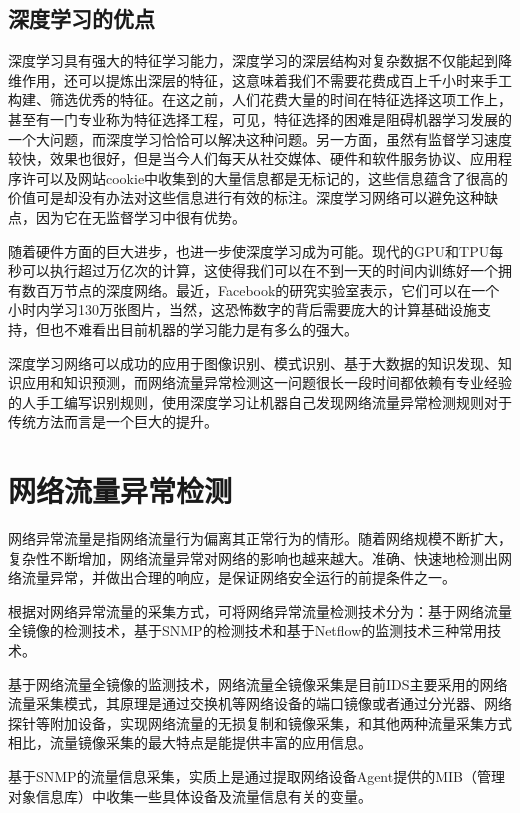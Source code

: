 \subsection{深度学习的优点}

深度学习具有强大的特征学习能力，深度学习的深层结构对复杂数据不仅能起到降维作用，还可以提炼出深层的特征，这意味着我们不需要花费成百上千小时来手工构建、筛选优秀的特征。在这之前，人们花费大量的时间在特征选择这项工作上，甚至有一门专业称为特征选择工程，可见，特征选择的困难是阻碍机器学习发展的一个大问题，而深度学习恰恰可以解决这种问题。另一方面，虽然有监督学习速度较快，效果也很好，但是当今人们每天从社交媒体、硬件和软件服务协议、应用程序许可以及网站cookie中收集到的大量信息都是无标记的，这些信息蕴含了很高的价值可是却没有办法对这些信息进行有效的标注。深度学习网络可以避免这种缺点，因为它在无监督学习中很有优势。

随着硬件方面的巨大进步，也进一步使深度学习成为可能。现代的GPU和TPU每秒可以执行超过万亿次的计算，这使得我们可以在不到一天的时间内训练好一个拥有数百万节点的深度网络。最近，Facebook的研究实验室表示，它们可以在一个小时内学习130万张图片，当然，这恐怖数字的背后需要庞大的计算基础设施支持，但也不难看出目前机器的学习能力是有多么的强大。

深度学习网络可以成功的应用于图像识别、模式识别、基于大数据的知识发现、知识应用和知识预测，而网络流量异常检测这一问题很长一段时间都依赖有专业经验的人手工编写识别规则，使用深度学习让机器自己发现网络流量异常检测规则对于传统方法而言是一个巨大的提升。

\section{网络流量异常检测}

网络异常流量是指网络流量行为偏离其正常行为的情形。随着网络规模不断扩大，复杂性不断增加，网络流量异常对网络的影响也越来越大。准确、快速地检测出网络流量异常，并做出合理的响应，是保证网络安全运行的前提条件之一。

根据对网络异常流量的采集方式，可将网络异常流量检测技术分为：基于网络流量全镜像的检测技术，基于SNMP的检测技术和基于Netflow的监测技术三种常用技术。

基于网络流量全镜像的监测技术，网络流量全镜像采集是目前IDS主要采用的网络流量采集模式，其原理是通过交换机等网络设备的端口镜像或者通过分光器、网络探针等附加设备，实现网络流量的无损复制和镜像采集，和其他两种流量采集方式相比，流量镜像采集的最大特点是能提供丰富的应用信息。

基于SNMP的流量信息采集，实质上是通过提取网络设备Agent提供的MIB（管理对象信息库）中收集一些具体设备及流量信息有关的变量。

